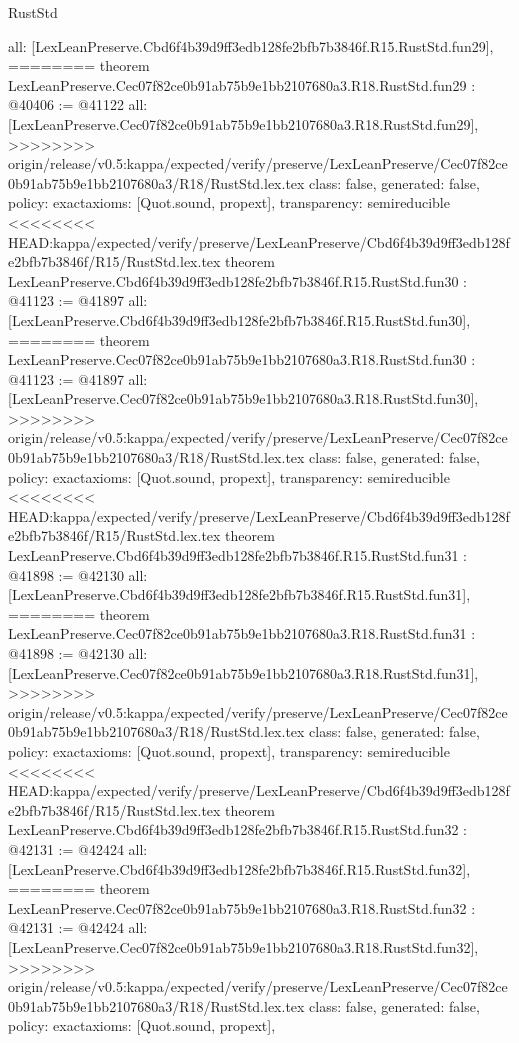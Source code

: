 \begin{lexlean}{RustStd}
\begin{coremodule}
{\begin{coremodule}
{{{{{{{{{{{{{{{{{{{{{{{{{{{{{{{{  all: [LexLeanPreserve.Cbd6f4b39d9ff3edb128fe2bfb7b3846f.R15.RustStd.fun29],
========
theorem LexLeanPreserve.Cec07f82ce0b91ab75b9e1bb2107680a3.R18.RustStd.fun29 : @40406 := @41122 {
  all: [LexLeanPreserve.Cec07f82ce0b91ab75b9e1bb2107680a3.R18.RustStd.fun29],
>>>>>>>> origin/release/v0.5:kappa/expected/verify/preserve/LexLeanPreserve/Cec07f82ce0b91ab75b9e1bb2107680a3/R18/RustStd.lex.tex
  class: false,
  generated: false,
  policy: exact{axioms: [Quot.sound, propext]},
  transparency: semireducible
}
<<<<<<<< HEAD:kappa/expected/verify/preserve/LexLeanPreserve/Cbd6f4b39d9ff3edb128fe2bfb7b3846f/R15/RustStd.lex.tex
theorem LexLeanPreserve.Cbd6f4b39d9ff3edb128fe2bfb7b3846f.R15.RustStd.fun30 : @41123 := @41897 {
  all: [LexLeanPreserve.Cbd6f4b39d9ff3edb128fe2bfb7b3846f.R15.RustStd.fun30],
========
theorem LexLeanPreserve.Cec07f82ce0b91ab75b9e1bb2107680a3.R18.RustStd.fun30 : @41123 := @41897 {
  all: [LexLeanPreserve.Cec07f82ce0b91ab75b9e1bb2107680a3.R18.RustStd.fun30],
>>>>>>>> origin/release/v0.5:kappa/expected/verify/preserve/LexLeanPreserve/Cec07f82ce0b91ab75b9e1bb2107680a3/R18/RustStd.lex.tex
  class: false,
  generated: false,
  policy: exact{axioms: [Quot.sound, propext]},
  transparency: semireducible
}
<<<<<<<< HEAD:kappa/expected/verify/preserve/LexLeanPreserve/Cbd6f4b39d9ff3edb128fe2bfb7b3846f/R15/RustStd.lex.tex
theorem LexLeanPreserve.Cbd6f4b39d9ff3edb128fe2bfb7b3846f.R15.RustStd.fun31 : @41898 := @42130 {
  all: [LexLeanPreserve.Cbd6f4b39d9ff3edb128fe2bfb7b3846f.R15.RustStd.fun31],
========
theorem LexLeanPreserve.Cec07f82ce0b91ab75b9e1bb2107680a3.R18.RustStd.fun31 : @41898 := @42130 {
  all: [LexLeanPreserve.Cec07f82ce0b91ab75b9e1bb2107680a3.R18.RustStd.fun31],
>>>>>>>> origin/release/v0.5:kappa/expected/verify/preserve/LexLeanPreserve/Cec07f82ce0b91ab75b9e1bb2107680a3/R18/RustStd.lex.tex
  class: false,
  generated: false,
  policy: exact{axioms: [Quot.sound, propext]},
  transparency: semireducible
}
<<<<<<<< HEAD:kappa/expected/verify/preserve/LexLeanPreserve/Cbd6f4b39d9ff3edb128fe2bfb7b3846f/R15/RustStd.lex.tex
theorem LexLeanPreserve.Cbd6f4b39d9ff3edb128fe2bfb7b3846f.R15.RustStd.fun32 : @42131 := @42424 {
  all: [LexLeanPreserve.Cbd6f4b39d9ff3edb128fe2bfb7b3846f.R15.RustStd.fun32],
========
theorem LexLeanPreserve.Cec07f82ce0b91ab75b9e1bb2107680a3.R18.RustStd.fun32 : @42131 := @42424 {
  all: [LexLeanPreserve.Cec07f82ce0b91ab75b9e1bb2107680a3.R18.RustStd.fun32],
>>>>>>>> origin/release/v0.5:kappa/expected/verify/preserve/LexLeanPreserve/Cec07f82ce0b91ab75b9e1bb2107680a3/R18/RustStd.lex.tex
  class: false,
  generated: false,
  policy: exact{axioms: [Quot.sound, propext]},
}}}}}}}}}}}}}}}}}}}}}}}}}}}}}}}}}}}}
\end{coremodule}}
\end{coremodule}
\end{lexlean}
